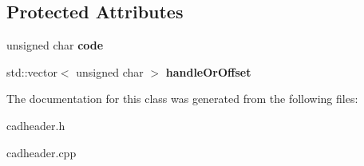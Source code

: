 \subsection*{Protected Attributes}
\begin{DoxyCompactItemize}
\item 
unsigned char {\bfseries code}\hypertarget{class_c_a_d_handle_ad787161f5d4f182e36439177f5324bcd}{}\label{class_c_a_d_handle_ad787161f5d4f182e36439177f5324bcd}

\item 
std\+::vector$<$ unsigned char $>$ {\bfseries handle\+Or\+Offset}\hypertarget{class_c_a_d_handle_a285ef4bd94fa410b53744b764545162b}{}\label{class_c_a_d_handle_a285ef4bd94fa410b53744b764545162b}

\end{DoxyCompactItemize}


The documentation for this class was generated from the following files\+:\begin{DoxyCompactItemize}
\item 
cadheader.\+h\item 
cadheader.\+cpp\end{DoxyCompactItemize}
